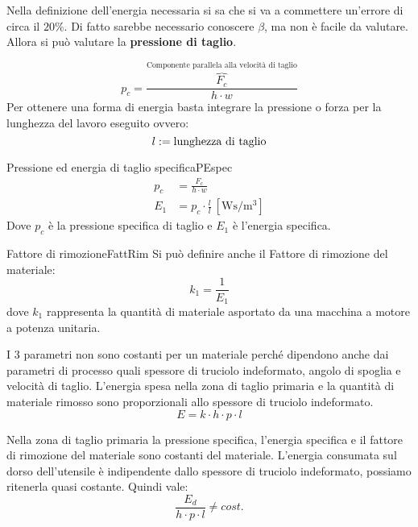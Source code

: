 Nella definizione dell'energia necessaria si sa che si va a commettere
un'errore di circa il $20\%$.
Di fatto sarebbe necessario conoscere $\beta$, ma non è facile da valutare.
Allora si può valutare la \textbf{pressione di taglio}.

\begin{equation}
p_c = \frac{\overbrace{F_c}^{\text{Componente parallela alla velocità di taglio}}}{h \cdot w}
\end{equation} 
Per ottenere una forma di energia basta integrare la pressione
o forza per la lunghezza del lavoro eseguito ovvero:
\begin{equation}
l := \text{lunghezza di taglio}\\
\end{equation}

\begin{definition}{Pressione ed energia di taglio specifica}{PEspec}
\begin{subequations}
\begin{align}
p_c &= \frac{F_c}{h \cdot w} \\
E_1 &= p_c \cdot \frac{l}{l} \:[\unit{\W\s/\m^3}]
\end{align}
\end{subequations}
Dove $p_c$ è la pressione specifica di taglio e $E_1$ è l'energia specifica.
\end{definition}

\begin{definition}{Fattore di rimozione}{FattRim}
Si può definire anche il Fattore di rimozione del materiale:
\begin{equation}
k_1 = \frac{1}{E_1}
\end{equation}
dove $k_1$ rappresenta la quantità di materiale asportato da una macchina
a motore a potenza unitaria.
\end{definition}

I 3 parametri non sono costanti per un materiale perché dipendono anche dai
parametri di processo quali spessore di truciolo indeformato, angolo di spoglia e
velocità di taglio.
L'energia spesa nella zona di taglio primaria e la quantità di materiale rimosso
sono proporzionali allo spessore di truciolo indeformato.
\begin{equation}
E = k \cdot h \cdot p \cdot l
\end{equation}

Nella zona di taglio primaria la pressione specifica, l'energia specifica e il fattore di
rimozione del materiale sono costanti del materiale.
L'energia consumata sul dorso dell'utensile è indipendente dallo spessore di
truciolo indeformato, possiamo ritenerla quasi costante.
Quindi vale:
\begin{equation}
\frac{E_d}{h \cdot p \cdot l} \neq cost.
\end{equation}

